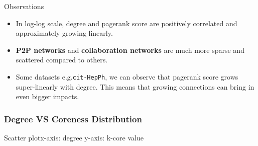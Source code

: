 Observations
\begin{itemize}
\item In log-log scale, degree and pagerank score are positively correlated and approximately growing linearly.
\item \textbf{P2P networks} and \textbf{collaboration networks} are much more sparse and scattered compared to others. 
\item Some datasets e.g.\texttt{cit-HepPh}, we can observe that pagerank score grows super-linearly with degree. This means that growing connections can bring in even bigger impacts.
\end{itemize}

\subsubsection{Degree VS Coreness Distribution}

Scatter plot\quad x-axis: degree \quad y-axis: k-core value

